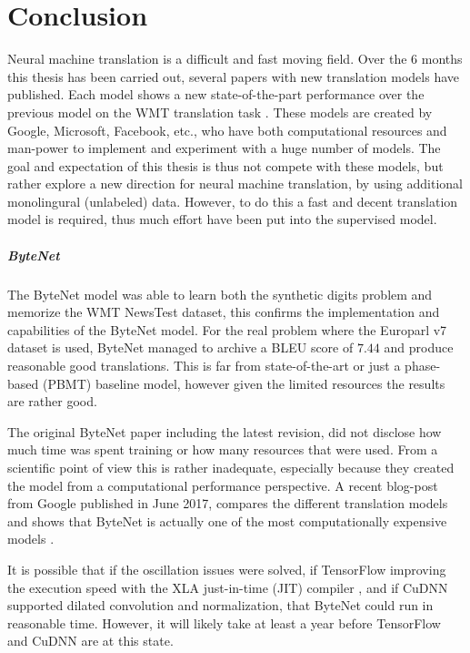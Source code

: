 \chapter{Conclusion}

Neural machine translation is a difficult and fast moving field. Over the 6 months this thesis has been carried out, several papers with new translation models have published. Each model shows a new state-of-the-part performance over the previous model on the WMT translation task \cite{bytenet, attention-is-all-you-need, tensor2tensor}. These models are created by Google, Microsoft, Facebook, etc., who have both computational resources and man-power to implement and experiment with a huge number of models. The goal and expectation of this thesis is thus not compete with these models, but rather explore a new direction for neural machine translation, by using additional monolingural (unlabeled) data. However, to do this a fast and decent translation model is required, thus much effort have been put into the supervised model.

\paragraph{ByteNet} The ByteNet model was able to learn both the synthetic digits problem and memorize the WMT NewsTest dataset, this confirms the implementation and capabilities of the ByteNet model. For the real problem where the Europarl v7 dataset is used, ByteNet managed to archive a BLEU score of $7.44$ and produce reasonable good translations. This is far from state-of-the-art or just a phase-based (PBMT) baseline model, however given the limited resources the results are rather good.

The original ByteNet paper including the latest revision, did not disclose how much time was spent training or how many resources that were used. From a scientific point of view this is rather inadequate, especially because they created the model from a computational performance perspective. A recent blog-post from Google published in June 2017, compares the different translation models and shows that ByteNet is actually one of the most computationally expensive models \cite{tensor2tensor}.

It is possible that if the oscillation issues were solved, if TensorFlow improving the execution speed with the XLA just-in-time (JIT) compiler \cite{google-xla}, and if CuDNN supported dilated convolution and normalization, that ByteNet could run in reasonable time. However, it will likely take at least a year before TensorFlow and CuDNN are at this state.

